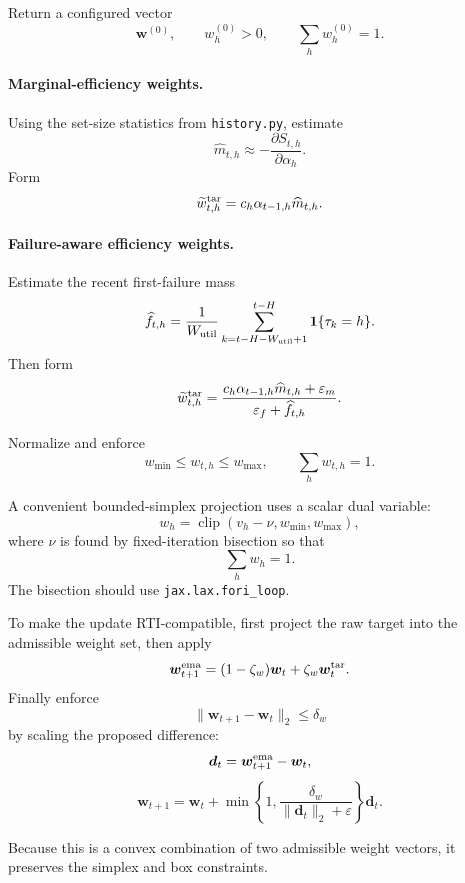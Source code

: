 \documentclass[11pt]{article}
\begin{document}
Return a configured vector
\[
    \bm w^{(0)},
    \qquad
    w_h^{(0)}>0,
    \qquad
    \sum_h w_h^{(0)}=1.
\]

\paragraph{Marginal-efficiency weights.}

Using the set-size statistics from \texttt{history.py}, estimate
\[
    \widehat m_{t,h}
    \approx
    -
    \frac{
        \partial S_{t,h}
    }{
        \partial\alpha_h
    }.
\]
Form
\[
    \widetilde w_{t,h}^{\rm tar}
    =
    c_h
    \alpha_{t-1,h}
    \widehat m_{t,h}.
\]

\paragraph{Failure-aware efficiency weights.}

Estimate the recent first-failure mass
\[
    \widehat f_{t,h}
    =
    \frac1{W_{\rm util}}
    \sum_{k=t-H-W_{\rm util}+1}^{t-H}
    \mathbf 1\{\tau_k=h\}.
\]
Then form
\[
    \widetilde w_{t,h}^{\rm tar}
    =
    \frac{
        c_h\alpha_{t-1,h}\widehat m_{t,h}
        +
        \varepsilon_m
    }{
        \varepsilon_f+\widehat f_{t,h}
    }.
\]

Normalize and enforce
\[
    w_{\min}
    \le
    w_{t,h}
    \le
    w_{\max},
    \qquad
    \sum_h w_{t,h}=1.
\]

A convenient bounded-simplex projection uses a scalar dual variable:
\[
    w_h
    =
    \operatorname{clip}
    (
        v_h-\nu,
        w_{\min},
        w_{\max}
    ),
\]
where $\nu$ is found by fixed-iteration bisection so that
\[
    \sum_h w_h=1.
\]
The bisection should use \texttt{jax.lax.fori\_loop}.

To make the update RTI-compatible, first project the raw target into the
admissible weight set, then apply
\[
    \bm w^{\rm ema}_{t+1}
    =
    (1-\zeta_w)\bm w_t
    +
    \zeta_w
    \bm w_t^{\rm tar}.
\]
Finally enforce
\[
    \|
        \bm w_{t+1}-\bm w_t
    \|_2
    \le
    \delta_w
\]
by scaling the proposed difference:
\[
    \bm d_t
    =
    \bm w^{\rm ema}_{t+1}-\bm w_t,
\]
\[
    \bm w_{t+1}
    =
    \bm w_t
    +
    \min
    \left\{
        1,
        \frac{\delta_w}{
            \|\bm d_t\|_2+\varepsilon
        }
    \right\}
    \bm d_t.
\]

Because this is a convex combination of two admissible weight vectors, it
preserves the simplex and box constraints.
\end{document}
